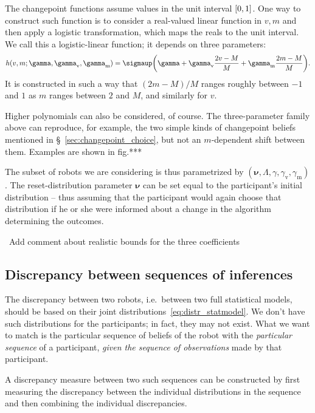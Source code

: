 \documentclass[\ifafour a4paper,12pt,\else a5paper,10pt,\fi%
onecolumn,oneside,article,%
british%
]{memoir}
\theoremstyle{remark}
\theoremstyle{innote}
\DeclarePairedDelimiter\clcl{[}{]}
\renewcommand*{\|}{\mathpunct{|}}
\newcommand*{\sect}{\S}%
\newcommand*{\fig}{fig.}%
\newcommand*{\ie}{{i.e.}}
\newcommand*{\puzzle}{\maltese}
\newcommand{\mynote}[1]{ {\color{notecolour}\puzzle\ #1\ }}
\newcommand*{\yN}{\varLambda}
\newcommand*{\yn}{\bm{\nu}}
\newcommand*{\yrs}{h}
\newcommand*{\yc}{\gamma}
\newcommand*{\ycs}{\gamma_{\textrm{v}}}
\newcommand*{\ycm}{\gamma_{\textrm{m}}}
\newcommand*{\logistic}{\sigmaup}
\begin{document}
The changepoint functions assume values in the unit interval $\clcl{0,1}$.
One way to construct such function is to consider a real-valued linear
function in $v,m$ and then apply a logistic transformation, which maps the
reals to the unit interval. We call this a logistic-linear function; it
depends on three parameters:
\begin{equation}
  \label{eq:logistic_linear}
  \yrs(v,m; \yc,\ycs,\ycm) = \logistic\biggl( \yc +
  \ycs \frac{2 v-M}{M} + \ycm \frac{2 m-M}{M}\biggr).
\end{equation}
It is constructed in such a way that $(2 m - M)/M$ ranges roughly between
$-1$ and $1$ as $m$ ranges between $2$ and $M$, and similarly for $v$.

Higher polynomials can also be considered, of course. The three-parameter
family above can reproduce, for example, the two simple kinds of
changepoint beliefs mentioned in \sect~\ref{sec:changepoint_choice}, but
not an $m$-dependent shift between them. Examples are shown in \fig***

The subset of robots we are considering is thus parametrized by
$(\yn,\yN,\yc,\ycs,\ycm)$. The reset-distribution parameter $\yn$ can be
set equal to the participant's initial distribution -- thus assuming that
the participant would again choose that distribution if he or she were
informed about a change in the algorithm determining the outcomes.


\mynote{Add comment about realistic bounds for the three coefficients}


\subsection{Discrepancy between sequences of inferences}
\label{sec:discrepancy_measure}

The discrepancy between two robots, \ie\ between two full statistical
models, should be based on their joint
distributions~\eqref{eq:distr_statmodel}. We don't have such distributions
for the participants; in fact, they may not exist. What we want to match is
the particular sequence of beliefs of the robot with the \emph{particular
  sequence} of a participant, \emph{given the sequence of observations}
made by that participant.

A discrepancy measure between two such sequences can be constructed by
first measuring the discrepancy between the individual distributions in the
sequence and then combining the individual discrepancies.


\medskip
\end{document}

